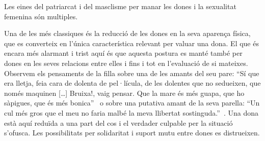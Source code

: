 Les eines del patriarcat i del masclisme per manar les dones i la sexualitat femenina són multiples.

Una de les més classiques és la reducció de les dones en la seva aparença física, que es converteix en l'única característica relevant per valuar una dona.
El que és encara més alarmant i trist aquí és que aquesta postura es manté també per dones en les seves relacions entre elles i fins i tot en l'evaluació de si mateixes.
Observem els pensaments de la filla sobre una de les amants del seu pare:
``Sí que era lletja, feia cara de dolenta de pel·lícula, de les dolentes que no sedueixen, que només maquinen [\ldots] Bruixa!, vaig pensar. Que la mare és més guapa, que ho sàpigues, que és més bonica''~\autocite[186]{ElHachmi2008}
o sobre una putativa amant de la seva parella:
``Un cul més gros que el meu no faria malbé la meva llibertat sostinguda.''~\autocite[308]{ElHachmi2008}.
Una dona està aquí reduïda a una part del cos i el verdader culpable per la situació s'ofusca.
Les possibilitats per solidaritat i suport mutu entre dones es distrueixen.

